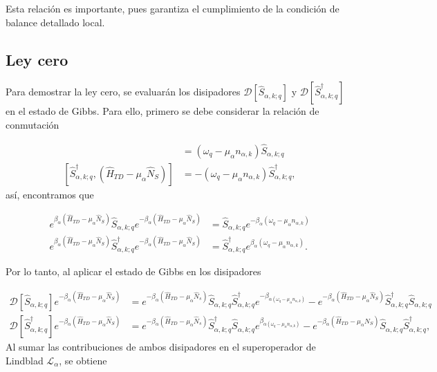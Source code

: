 \begin{appendixs}
Esta relación es importante, pues garantiza el cumplimiento de la condición de balance detallado local. 

\label{apendixKMS}


\newpage

\subsection{Ley cero}
Para demostrar la ley cero, se evaluarán los disipadores $\mathcal{D}[\hat{S}_{\alpha,k;q}]$ y $\mathcal{D}[\hat{S}^{\dagger}_{\alpha,k;q}]$ en el estado de Gibbs. Para ello, primero se debe considerar la relación de conmutación

\begin{align*}
    [\hat{S}_{\alpha,k;q},(\hat{H}_{TD} - \mu_{\alpha}\hat{N}_{S})] & = (\omega_{q} - \mu_{\alpha}n_{\alpha,k})\hat{S}_{\alpha,k;q}  \\
    [\hat{S}^{\dagger}_{\alpha,k;q},(\hat{H}_{TD} - \mu_{\alpha}\hat{N}_{S})] & = -(\omega_{q} - \mu_{\alpha}n_{\alpha,k})\hat{S}^{\dagger}_{\alpha,k;q},
\end{align*}
así, encontramos que 

 \begin{align*}
    e^{\beta_{\alpha}(\hat{H}_{TD} - \mu_{\alpha}\hat{N}_{S})}\hat{S}_{\alpha,k;q} e^{-\beta_{\alpha}(\hat{H}_{TD} - \mu_{\alpha}\hat{N}_{S})} & = \hat{S}_{\alpha,k;q}e^{-\beta_{\alpha}(\omega_{q} - \mu_{\alpha}n_{\alpha,k})} \\
    e^{\beta_{\alpha}(\hat{H}_{TD} - \mu_{\alpha}\hat{N}_{S})}\hat{S}^{\dagger}_{\alpha,k;q} e^{-\beta_{\alpha}(\hat{H}_{TD} - \mu_{\alpha}\hat{N}_{S})} & = \hat{S}^{\dagger}_{\alpha,k;q}e^{\beta_{\alpha}(\omega_{q} - \mu_{\alpha}n_{\alpha,k})}.
 \end{align*}

Por lo tanto, al aplicar el estado de Gibbs en los disipadores 

\begin{align*}
    \mathcal{D}[\hat{S}_{\alpha,k;q}]e^{-\beta_{\alpha}(\hat{H}_{TD} - \mu_{\alpha}\hat{N}_{S})} & =  e^{-\beta_{\alpha}(\hat{H}_{TD} - \mu_{\alpha}\hat{N}_{s})} \hat{S}_{\alpha,k;q}\hat{S}^{\dagger}_{\alpha,k;q} e^{-\beta_{\alpha(\omega_{q} - \mu_{\alpha}n_{\alpha,k})}} - e^{-\beta_{\alpha}(\hat{H}_{TD} - \mu_{\alpha}\hat{N}_{S})} \hat{S}^{\dagger}_{\alpha,k;q}\hat{S}_{\alpha,k;q} \\
    \mathcal{D}[\hat{S}^{\dagger}_{\alpha,k;q}]e^{-\beta_{\alpha}(\hat{H}_{TD} - \mu_{\alpha}\hat{N}_{S})} & = e^{-\beta_{\alpha}(\hat{H}_{TD} - \mu_{\alpha}\hat{N}_{s})} \hat{S}^{\dagger}_{\alpha,k;q}\hat{S}_{\alpha,k;q} e^{\beta_{\alpha(\omega_{q} - \mu_{\alpha}n_{\alpha,k})}} - e^{-\beta_{\alpha}(\hat{H}_{TD} - \mu_{\alpha}\hat{N}_{S})} \hat{S}_{\alpha,k;q}\hat{S}^{\dagger}_{\alpha,k;q}, 
\end{align*}
Al sumar las contribuciones de ambos disipadores en el superoperador de Lindblad $\mathcal{L}_{\alpha}$, se obtiene 


\end{appendixs}
